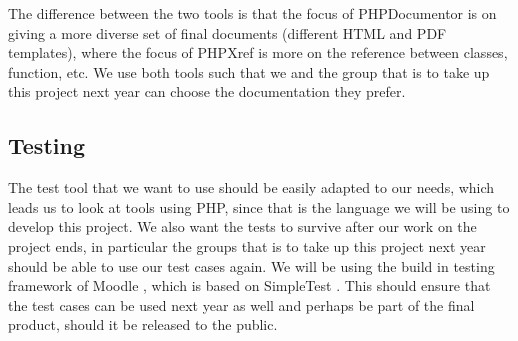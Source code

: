 The difference between the two tools is that the focus of PHPDocumentor is on giving a more diverse set of final documents (different HTML and PDF templates), where the focus of PHPXref is more on the reference between classes, function, etc.
We use both tools such that we and the group that is to take up this project next year can choose the documentation they prefer.


\subsection{Testing}
\label{sub:testing}
The test tool that we want to use should be easily adapted to our needs, which leads us to look at tools using PHP, since that is the language we will be using to develop this project.
We also want the tests to survive after our work on the project ends, in particular the groups that is to take up this project next year should be able to use our test cases again.
We will be using the build in testing framework of Moodle \cite{moodletest}, which is based on SimpleTest \cite{simpletest}.
This should ensure that the test cases can be used next year as well and perhaps be part of the final product, should it be released to the public.


